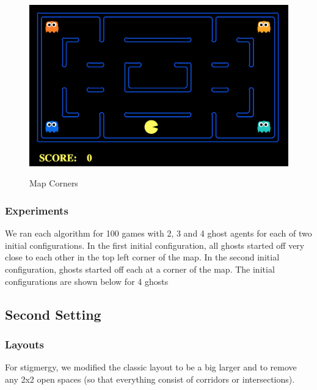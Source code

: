 \documentclass[11pt]{article}
\begin{document}
\begin{multicols}{2}
\begin{figure}
	\includegraphics[width=\columnwidth]{mapcorners.png}\\
	\caption{Map Corners}
	\label{fig:mapcorners}
\end{figure}

\subsubsection{Experiments}
We ran each algorithm for 100 games with 2, 3 and 4 ghost agents for each of two initial configurations. In the first initial configuration, all ghosts started off very close to each other in the top left corner of the map. In the second initial configuration, ghosts started off each at a corner of the map. The initial configurations are shown below for 4 ghosts

\subsection{Second Setting}

\subsubsection{Layouts}
For stigmergy, we modified the classic layout to be a big larger and to remove any 2x2 open spaces (so that everything consist of corridors or intersections).  


\end{multicols}
\end{document}
